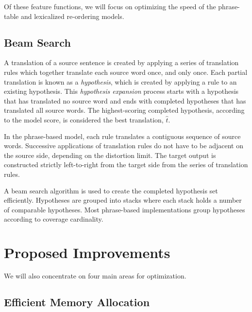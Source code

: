 \documentclass[11pt]{article}
\begin{document}
Of these feature functions, we will focus on optimizing the speed of the phrase-table and lexicalized re-ordering models.


\subsection{Beam Search}

A translation of a source sentence is created by applying a series of translation rules which together translate each source word once, and only once. Each partial translation is known as a \emph{hypothesis}, which is created by applying a rule to an existing hypothesis. This \emph{hypothesis expansion} process starts with a hypothesis that has translated no source word and ends with completed hypotheses that has translated all source words. The highest-scoring completed hypothesis, according to the model score, is considered the best translation, $\hat{t} $.

In the phrase-based model, each rule translates a contiguous sequence of source words. Successive applications of translation rules do not have to be adjacent on the source side, depending on the distortion limit. The target output is constructed strictly left-to-right from the target side from the series of translation rules. 

A beam search algorithm is used to create the completed hypothesis set efficiently. Hypotheses are grouped into stacks where each stack holds a number of comparable hypotheses. Most phrase-based implementations group hypotheses according to coverage cardinality. %

\section{Proposed Improvements}
\label{sec:Proposed Improvements}

We will also concentrate on four main areas for optimization.

\subsection{Efficient Memory Allocation}
\end{document}
